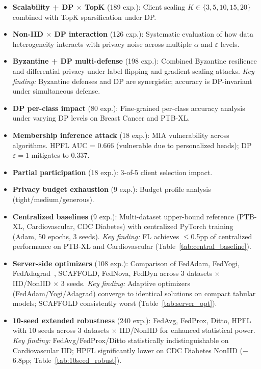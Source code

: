 \documentclass[conference]{IEEEtran}
\begin{document}
\begin{itemize}
    \item \textbf{Scalability + DP $\times$ TopK} (189 exp.): Client scaling $K{\in}\{3, 5, 10, 15, 20\}$ combined with TopK sparsification under DP.
    \item \textbf{Non-IID $\times$ DP interaction} (126 exp.): Systematic evaluation of how data heterogeneity interacts with privacy noise across multiple $\alpha$ and $\varepsilon$ levels.
    \item \textbf{Byzantine + DP multi-defense} (198 exp.): Combined Byzantine resilience and differential privacy under label flipping and gradient scaling attacks. \textit{Key finding:} Byzantine defenses and DP are synergistic; accuracy is DP-invariant under simultaneous defense.
    \item \textbf{DP per-class impact} (80 exp.): Fine-grained per-class accuracy analysis under varying DP levels on Breast Cancer and PTB-XL.
    \item \textbf{Membership inference attack} (18 exp.): MIA vulnerability across algorithms. HPFL AUC = 0.666 (vulnerable due to personalized heads); DP $\varepsilon{=}1$ mitigates to 0.337.
    \item \textbf{Partial participation} (18 exp.): 3-of-5 client selection impact.
    \item \textbf{Privacy budget exhaustion} (9 exp.): Budget profile analysis (tight/medium/generous).
    \item \textbf{Centralized baselines} (9 exp.): Multi-dataset upper-bound reference (PTB-XL, Cardiovascular, CDC Diabetes) with centralized PyTorch training (Adam, 50 epochs, 3 seeds). \textit{Key finding:} FL achieves $\leq$0.5pp of centralized performance on PTB-XL and Cardiovascular (Table~\ref{tab:central_baseline}).
    \item \textbf{Server-side optimizers} (108 exp.): Comparison of FedAdam, FedYogi, FedAdagrad~\cite{reddi2021adaptive}, SCAFFOLD, FedNova, FedDyn across 3 datasets $\times$ IID/NonIID $\times$ 3 seeds. \textit{Key finding:} Adaptive optimizers (FedAdam/Yogi/Adagrad) converge to identical solutions on compact tabular models; SCAFFOLD consistently worst (Table~\ref{tab:server_opt}).
    \item \textbf{10-seed extended robustness} (240 exp.): FedAvg, FedProx, Ditto, HPFL with 10 seeds across 3 datasets $\times$ IID/NonIID for enhanced statistical power. \textit{Key finding:} FedAvg/FedProx/Ditto statistically indistinguishable on Cardiovascular IID; HPFL significantly lower on CDC Diabetes NonIID ($-$6.8pp; Table~\ref{tab:10seed_robust}).

\end{itemize}
\end{document}
